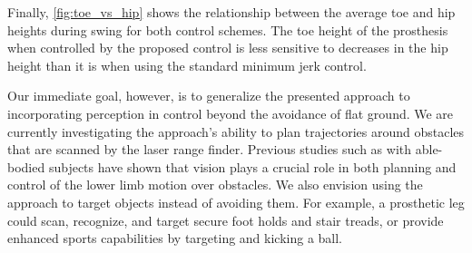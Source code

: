 Finally, \cref{fig:toe_vs_hip} shows the relationship between the average
toe and hip heights during swing for both control schemes. The toe height of the
prosthesis when controlled by the proposed control is less sensitive to
decreases in the hip height than it is when using the standard minimum jerk
control.

Our immediate goal, however, is to generalize the presented approach to
incorporating perception in control beyond the avoidance of flat ground. We are
currently investigating the approach's ability to plan trajectories around
obstacles that are scanned by the laser range finder. Previous studies such as
\citet{mohagheghi2004effects} with able-bodied subjects have shown that vision
plays a crucial role in both planning and control of the lower limb motion over
obstacles. We also envision using the approach to target objects instead of
avoiding them. For example, a prosthetic leg could scan, recognize, and target
secure foot holds and stair treads, or provide enhanced sports capabilities by
targeting and kicking a ball.
